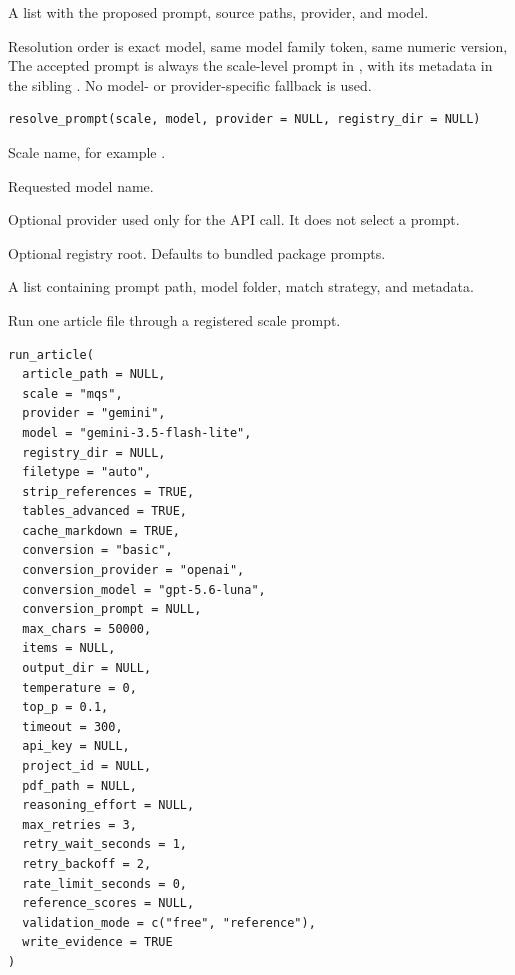 \documentclass[a4paper]{book}
\begin{document}
%
\begin{Value}
A list with the proposed prompt, source paths, provider, and model.
\end{Value}
%
\begin{Description}
Resolution order is exact model, same model family token, same numeric version,
The accepted prompt is always the scale-level prompt in
, with its metadata in the sibling
. No model- or provider-specific fallback is used.
\end{Description}
%
\begin{Usage}
\begin{verbatim}
resolve_prompt(scale, model, provider = NULL, registry_dir = NULL)
\end{verbatim}
\end{Usage}
%
\begin{Arguments}
\begin{ldescription}
\item[\code{scale}] Scale name, for example .

\item[\code{model}] Requested model name.

\item[\code{provider}] Optional provider used only for the API call. It does not
select a prompt.

\item[\code{registry\_dir}] Optional registry root. Defaults to bundled package prompts.
\end{ldescription}
\end{Arguments}
%
\begin{Value}
A list containing prompt path, model folder, match strategy, and metadata.
\end{Value}
%
\begin{Description}
Run one article file through a registered scale prompt.
\end{Description}
%
\begin{Usage}
\begin{verbatim}
run_article(
  article_path = NULL,
  scale = "mqs",
  provider = "gemini",
  model = "gemini-3.5-flash-lite",
  registry_dir = NULL,
  filetype = "auto",
  strip_references = TRUE,
  tables_advanced = TRUE,
  cache_markdown = TRUE,
  conversion = "basic",
  conversion_provider = "openai",
  conversion_model = "gpt-5.6-luna",
  conversion_prompt = NULL,
  max_chars = 50000,
  items = NULL,
  output_dir = NULL,
  temperature = 0,
  top_p = 0.1,
  timeout = 300,
  api_key = NULL,
  project_id = NULL,
  pdf_path = NULL,
  reasoning_effort = NULL,
  max_retries = 3,
  retry_wait_seconds = 1,
  retry_backoff = 2,
  rate_limit_seconds = 0,
  reference_scores = NULL,
  validation_mode = c("free", "reference"),
  write_evidence = TRUE
)
\end{verbatim}
\end{Usage}
\end{document}
